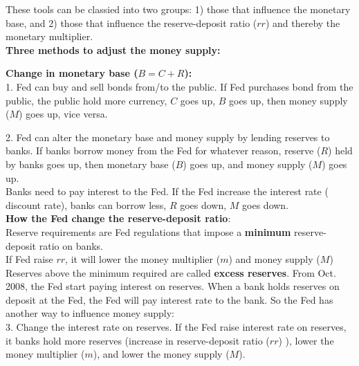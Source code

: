 \documentclass[12pt]{article}
\begin{document}
These tools can be classied into two groups: 1) those that influence the monetary base,
and 2) those that influence the reserve-deposit ratio ($ rr $) and thereby the 
monetary multiplier.\\

{\textbf {Three methods to adjust the money supply:}}

{\textbf {Change in monetary base ($ B = C + R $):}}\\
1. Fed can buy and sell bonds from/to the public. If Fed purchases bond from the
public, the public hold more currency, $ C $ goes up, $ B $ goes up, then money supply
($ M $) goes up, vice versa.

2. Fed can alter the monetary base and money supply by lending reserves to banks.
If banks borrow money from the Fed for whatever reason, reserve ($ R $) held by banks 
goes up, then monetary base ($ B $) goes up, and money supply ($ M $) goes up.\\
Banks need to pay interest to the Fed. If the Fed increase the interest rate (
discount rate), banks can borrow less, $ R $ goes down, $ M $ goes down.\\



{\textbf {How the Fed change the reserve-deposit ratio}}:\\
Reserve requirements are Fed regulations that impose a {\textbf {minimum}} 
reserve-deposit ratio on banks.\\
If Fed raise $ rr $, it will lower the money multiplier ($ m $) and money supply 
($ M $)\\
Reserves above the minimum required are called {\textbf {excess reserves}}.
From Oct. 2008, the Fed start paying interest on reserves. When a bank holds reserves
on deposit at the Fed, the Fed will pay interest rate to the bank. So the Fed has
another way to influence money supply:\\
3. Change the interest rate on reserves. If the Fed raise interest rate on reserves,
it banks hold more reserves (increase in reserve-deposit ratio ($ rr $)
), lower the money multiplier ($ m $), and lower the money supply ($ M $).
\end{document}
